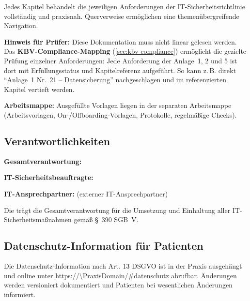 Jedes Kapitel behandelt die jeweiligen Anforderungen der IT-Sicherheitsrichtlinie
vollständig und praxisnah. Querverweise ermöglichen eine themenübergreifende Navigation.

\textbf{Hinweis für Prüfer:} Diese Dokumentation muss nicht linear gelesen werden.
Das \textbf{KBV-Compliance-Mapping} (\cref{sec:kbv-compliance}) ermöglicht die gezielte
Prüfung einzelner Anforderungen: Jede Anforderung der Anlage~1, 2 und 5 ist dort
mit Erfüllungsstatus und Kapitelreferenz aufgeführt. So kann z.\,B. direkt
\enquote{Anlage~1 Nr.~21 -- Datensicherung} nachgeschlagen und im referenzierten Kapitel
vertieft werden.

\textbf{Arbeitsmappe:} Ausgefüllte Vorlagen liegen in der separaten Arbeitsmappe
(Arbeitsvorlagen, On-/Offboarding-Vorlagen, Protokolle, regelmäßige Checks).

\subsection{Verantwortlichkeiten}

\textbf{Gesamtverantwortung:} \Gesamtverantwortung

\textbf{IT-Sicherheitsbeauftragte:} \ITSicherheitsbeauftragte

\textbf{IT-Ansprechpartner:} \ITAnsprechpartner{} (externer IT-Ansprechpartner)

Die \PraxisInhaberBezeichnung{} trägt die Gesamtverantwortung für die Umsetzung und Einhaltung aller
IT-Sicher\-heits\-maß\-nah\-men gemäß §~390 SGB~V.

\subsection{Datenschutz-Information für Patienten}

Die Datenschutz-Information nach Art. 13 DSGVO ist in der Praxis ausgehängt und
online unter \url{https://\PraxisDomain/#datenschutz} abrufbar. Änderungen werden
versioniert dokumentiert und Patienten bei wesentlichen Änderungen informiert.
